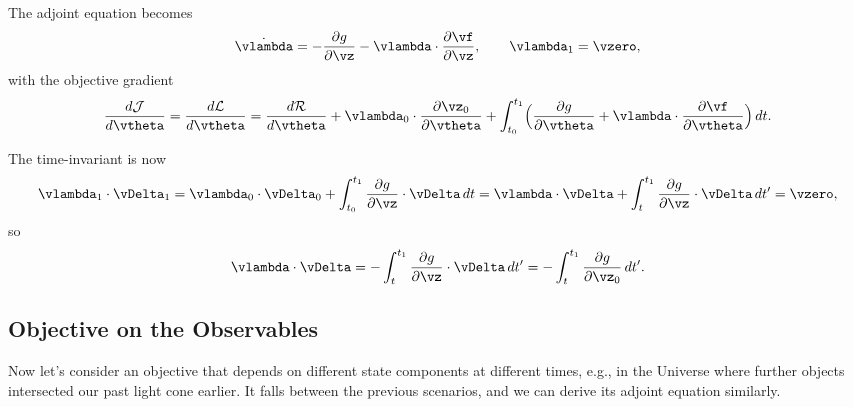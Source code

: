 \documentclass[modern, trackchanges, dvipsnames]{aastex631}
\renewcommand{\d}{d}
\newcommand{\p}{\partial}
\newcommand{\cJ}{\mathcal{J}}
\newcommand{\cR}{\mathcal{R}}
\newcommand{\cL}{\mathcal{L}}
\begin{document}
The adjoint equation becomes
%
\begin{equation}
\dot\vlambda = - \frac{\p g}{\p\vz}
  - \vlambda \cdot \frac{\p\vf}{\p\vz},
\qquad
\vlambda_1 = \vzero,
\end{equation}
%
with the objective gradient
%
\begin{equation}
\frac{\d\cJ}{\d\vtheta}
= \frac{\d\cL}{\d\vtheta}
= \frac{\d\cR}{\d\vtheta} + \vlambda_0 \cdot \frac{\p\vz_0}{\p\vtheta}
+ \int_{t_0}^{t_1} \Bigl( \frac{\p g}{\p\vtheta}
  + \vlambda \cdot \frac{\p\vf}{\p\vtheta} \Bigr) \, \d t.
\end{equation}

The time-invariant is now
%
\begin{equation}
\vlambda_1 \cdot \vDelta_1
= \vlambda_0 \cdot \vDelta_0
  + \int_{t_0}^{t_1} \frac{\p g}{\p\vz} \cdot \vDelta \, \d t
= \vlambda \cdot \vDelta
  + \int_t^{t_1} \frac{\p g}{\p\vz} \cdot \vDelta \, \d t'
= \vzero,
\end{equation}
%
so
%
\begin{equation}
\vlambda \cdot \vDelta
= - \int_t^{t_1} \frac{\p g}{\p\vz} \cdot \vDelta \, \d t'
= - \int_t^{t_1} \frac{\p g}{\p\vz_0} \, \d t'.
\end{equation}


\vspace{1em}
\subsection{Objective on the Observables}
\label{app:lightcone}

Now let's consider an objective that depends on different state
components at different times, e.g., in the Universe where further
objects intersected our past light cone earlier.
It falls between the previous scenarios, and we can derive its adjoint
equation similarly.
\end{document}

